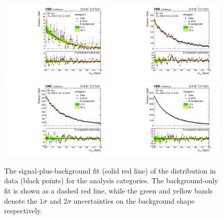 \begin{figure}[hpt!]
\centering
\includegraphics[width=0.49\textwidth]{statandresultsFigures/S_SB_ProfileMH_UntaggedTag_0_13TeV.pdf} 
\includegraphics[width=0.49\textwidth]{statandresultsFigures/S_SB_ProfileMH_UntaggedTag_1_13TeV.pdf}\\ 
\includegraphics[width=0.49\textwidth]{statandresultsFigures/S_SB_ProfileMH_UntaggedTag_2_13TeV.pdf} 
\includegraphics[width=0.49\textwidth]{statandresultsFigures/S_SB_ProfileMH_UntaggedTag_3_13TeV.pdf} \\
\caption{The signal-plus-background fit (solid red line) of the \mgg distribution in data (black points) for the \Untagged analysis categories. The background-only fit is shown as a dashed red line, while the green and yellow bands denote the $1\sigma$ and $2\sigma$ uncertainties on the background shape respectively.}

\label{fig:statandresults:s_b_fits}
\end{figure}

